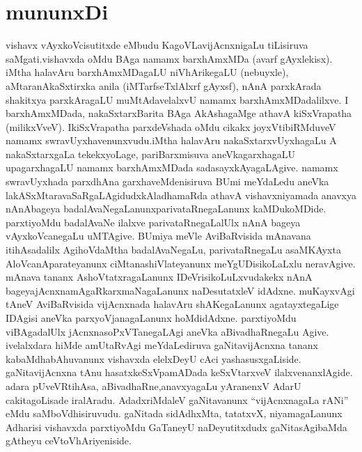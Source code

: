 \chapter*{mununxDi}


\qquad vishavx vAyxkoVcisutitxde eMbudu KagoVLavijAcnxnigaLu tiLisiruva saMgati.\break vishavxda oMdu BAga namamx barxhAmxMDa (avarf gAyxlekisx). iMtha halavAru barxhAmxMDa\-gaLU niVhArikegaLU (nebuyxle), aMtaranAkaSxtirxka anila (iMTarfseTxlAlxrf gAyxsf), nAnA parxkArada shakitxya parxkAragaLU muMtAdavelalxvU namamx barxhAmxMDadalilxve. I barxhAmxMDada, nakaSxtarxBarita BAga AkAshagaMge athavA kiSxVrapatha (milikxVveV). I\break kiSxVrapatha parxdeVshada oMdu cikakx joyxVtibiRMduveV namamx swravUyxhavenunxvudu.\break iMtha halavAru nakaSxtarxvUyxhagaLu A nakaSxtarxgaLa tekekxyoLage, pariBarxmisuva aneVka\break garxhagaLU upagarxhagaLU namamx barxhAmxMDada sadasayxkAyagaLAgive. namamx swra\-vUyxhada parxdhAna garxhaveMdenisiruva BUmi meYdaLedu aneVka lakASxMtaravaSaRgaLAgidudx\break kAladhamaRda athavA vishavxniyamada anavxya nAnAbageya badalAvaNegaLanunx\break parivataRnegaLanunx kaMDukoMDide. parxtiyoMdu badalAvaNe ilalxve parivataRne\-gaLalUlx nAnA bageya vAyxkoVcanegaLu uMTAgive. BUmiya meVle AviBaR\-visida mAnavana itihAsadalilx AgihoVdaMtha badalAvaNegaLu, parivataRnegaLu asaMKAyxta AloVcanAparateyanunx ciMtanashiVlateyanunx meYgUDisikoLaLxlu nera\-vAgive.  mAnava tananx AshoVtatxragaLanunx IDeVrisikoLuLxvudakekx nAnA bageya\break jAcnxnamAgaRkarxmaNagaLanunx naDesutatxleV idAdxne. muKayxvAgi tAneV AviBaRvisida vijAcnxnada halavAru shAKegaLanunx agatayxtegaLige IDAgisi aneVka parxyoVjanagaLanunx hoMdidAdxne.  parxtiyoMdu viBAgadalUlx jAcnxnasoPxVTanegaLAgi aneVka aBivadhaR\-negaLu Agive. ivelalxdara hiMde amUtaRvAgi meYdaLediruva gaNitavijAcnxna tananx kabaMdhabAhuvanunx vishavxda elelxDeyU cAci yashasusxgaLiside. gaNitavijAcnxna tAnu hasatxkeSxVpamADada keSxVtarxveV ilalxvenanxlAgide. adara pUveVRtihAsa, aBivadhaRne,\break anavxyagaLu  yAranenxV AdarU cakitagoLisade iralAradu. AdadxriMdaleV gaNita\-vanunx  ``vijAcnxnagaLa rANi'' eMdu saMboVdhisiruvudu. gaNitada sidAdhxMta, tatatxvX, niyamagaLanunx Adharisi vishavxda parxtiyoMdu GaTaneyU naDeyutitxdudx gaNita\break sAgibaMda gAtheyu ceVtoVhAriyeniside.

\bigskip

